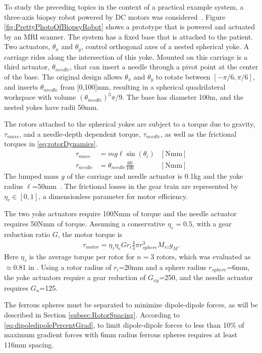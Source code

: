 \documentclass[letterpaper, 10 pt]{IEEEtran}
\begin{document}
To study the preceding topics in the context of a practical example system, a three-axis biopsy robot powered by DC motors was considered~\cite{Walsh2010}.  Figure \ref{fig:PrettyPhotoOfBiopsyRobot} shows a prototype that is powered and actuated by an MRI scanner.  The system has a fixed base that is attached to the patient.   Two actuators, $\theta_x$ and $\theta_y$, control orthogonal axes of a nested spherical yoke.  A carriage rides along the intersection of this yoke.  Mounted on this carriage is a third actuator, $\theta_{needle}$,  that can insert a needle through a pivot point at the center of the base.  The original design allows $\theta_x$ and $\theta_y$ to rotate between $[-\pi/6,\pi/6]$, and inserts $\theta_{needle}$ from [0,100]mm, resulting in a  spherical quadrilateral workspace with volume $(\theta_{needle})^3\pi/9$.  The base has diameter 100m, and the nested yokes have radii 50mm.

The rotors attached to the spherical yokes are subject to a torque due to gravity, $\tau_{mass}$, and a needle-depth dependent torque, $\tau_{needle}$, as well as the frictional torques in \eqref{eq:rotorDynamics}.
\begin{align}
\tau_{mass} &= m  g  \ell  \sin(\theta_i) &\mathrm{[Nmm]} \nonumber \\
\tau_{needle} &= \theta_{needle} \frac{60}{100} &\mathrm{[Nmm]} 
\end{align}
The lumped mass $g$ of the carriage and needle actuator is 0.1kg and the yoke radius $\ell$=50mm~\cite{Walsh2010}.  The frictional losses in the gear train are represented by $\eta_e \in[0,1]$, a dimensionless parameter for motor efficiency.  

The two yoke actuators require 100Nmm of torque and the needle actuator requires 50Nmm of torque.  Assuming a conservative $\eta_e=0.5$, with a gear reduction ratio $G$, the motor torque is
\begin{align}
\tau_{motor}  =  \eta_\tau  \eta_e G r_i \frac{4}{3} \pi r_{sphere}^3 M_{sz} g_{M}  . \label{eq:RotorForceGear}
\end{align}
Here $\eta_\tau$ is the average torque per rotor for $n=3$ rotors, which was evaluated as $\approx$0.81 in   \cite{Becker2014}. 
Using a rotor radius of $r_i$=20mm and a sphere radius $r_{sphere}$=6mm, the yoke actuators require a gear reduction of $G_{xy}$=250, and the needle actuator requires $G_{n}$=125. 


The ferrous spheres must be separated to minimize dipole-dipole forces, as will be described in Section \ref{subsec:RotorSpacing}. According to \eqref{eq:dipoledipolePercentGrad}, to limit dipole-dipole forces to less than 10\% of maximum gradient forces with 6mm radius ferrous spheres requires at least 116mm spacing. 
\end{document}
